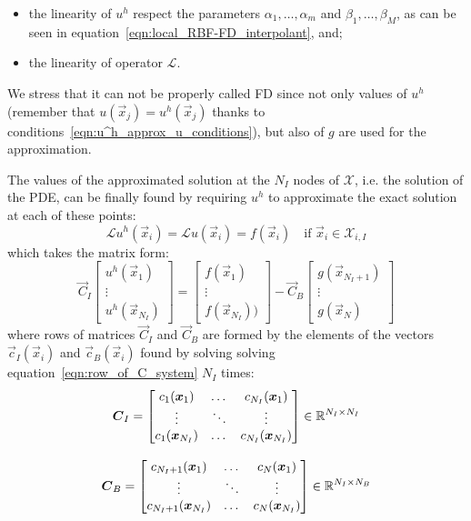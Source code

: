 \begin{itemize}
	\item the linearity of $u^h$ respect the parameters $\alpha_1, \dots, \alpha_m$ and $\beta_1, \dots, \beta_M$, as can be seen in equation~\eqref{eqn:local_RBF-FD_interpolant}, and;
	\item the linearity of operator $\mathcal{L}$.
\end{itemize}
We stress that it can not be properly called FD since not only values of $u^h$ (remember that $u(\vec{x}_j) = u^h(\vec{x}_j)$ thanks to conditions~\eqref{eqn:u^h_approx_u_conditions}), but also of $g$ are used for the approximation.

\medskip
The values of the approximated solution at the $N_I$ nodes of $\mathcal{X}$, i.e. the solution of the PDE, can be finally found by requiring $u^h$ to approximate the exact solution at each of these points:
\begin{equation}
	\mathcal{L}u^h(\vec{x}_i) = \mathcal{L}u(\vec{x}_i) = f(\vec{x}_i)  \quad  \text{if $\vec{x}_i \in \mathcal{X}_{i,I}$}
\end{equation}
which takes the matrix form:
\begin{equation}
\label{eqn:discretized_version_of_PDE_using_RBF-FD}
\vec{C}_I
\begin{bmatrix}
	u^h(\vec{x}_1)  \\
	\vdots			\\
	u^h(\vec{x}_{N_I})
\end{bmatrix}
=
\begin{bmatrix}
	f(\vec{x}_1)  \\
	\vdots		  \\
	f(\vec{x}_{N_I}))
\end{bmatrix}
-
\vec{C}_B
\begin{bmatrix}
	g(\vec{x}_{N_I+1})  \\
	\vdots				\\
	g(\vec{x}_{N})
\end{bmatrix}
\end{equation}
where rows of matrices $\vec{C}_I$ and $\vec{C}_B$ are formed by the elements of the vectors $\vec{c}_I(\vec{x}_i)$ and $\vec{c}_B(\vec{x}_i)$ found by solving solving equation~\eqref{eqn:row_of_C_system} $N_I$ times:
\begin{equation}
	\begin{gathered}
		\boldsymbol{C}_I = \begin{bmatrix}
						c_1{(\boldsymbol{x}_1)}  	&  \dots  & c_{N_I}(\boldsymbol{x}_1)  	\\
						\vdots				& \ddots  & \vdots					\\
						c_1{(\boldsymbol{x}_{N_I})}  &  \dots  & c_{N_I}(\boldsymbol{x}_{N_I})
					\end{bmatrix} \in \mathbb{R}^{N_I \times N_I}  \\[2ex]
		\boldsymbol{C}_B = \begin{bmatrix}
						c_{N_I+1}{(\boldsymbol{x}_1)}  	  &  \dots  & c_{N}(\boldsymbol{x}_1)  	\\
						\vdots					  & \ddots  & \vdots				\\
						c_{N_I+1}{(\boldsymbol{x}_{N_I})}  &  \dots  & c_{N}(\boldsymbol{x}_{N_I})
					\end{bmatrix} \in \mathbb{R}^{N_I \times N_B}
	\end{gathered}
\end{equation}

